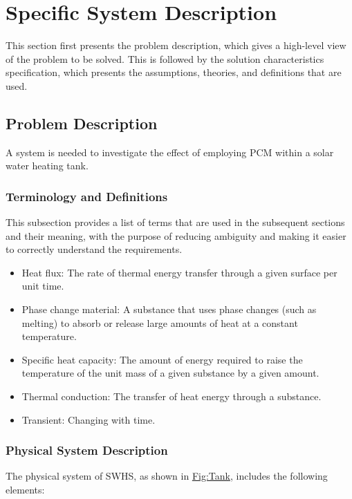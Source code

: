 \documentclass[12pt]{article}
\begin{document}
\section{Specific System Description}
\label{Sec:SpecSystDesc}
This section first presents the problem description, which gives a high-level view of the problem to be solved. This is followed by the solution characteristics specification, which presents the assumptions, theories, and definitions that are used.

\subsection{Problem Description}
\label{Sec:ProbDesc}
A system is needed to investigate the effect of employing PCM within a solar water heating tank.

\subsubsection{Terminology and Definitions}
\label{Sec:TermDefs}
This subsection provides a list of terms that are used in the subsequent sections and their meaning, with the purpose of reducing ambiguity and making it easier to correctly understand the requirements.

\begin{itemize}
\item{Heat flux: The rate of thermal energy transfer through a given surface per unit time.}
\item{Phase change material: A substance that uses phase changes (such as melting) to absorb or release large amounts of heat at a constant temperature.}
\item{Specific heat capacity: The amount of energy required to raise the temperature of the unit mass of a given substance by a given amount.}
\item{Thermal conduction: The transfer of heat energy through a substance.}
\item{Transient: Changing with time.}
\end{itemize}
\subsubsection{Physical System Description}
\label{Sec:PhysSyst}
The physical system of SWHS, as shown in \hyperref[Figure:Tank]{Fig:Tank}, includes the following elements:
\end{document}
